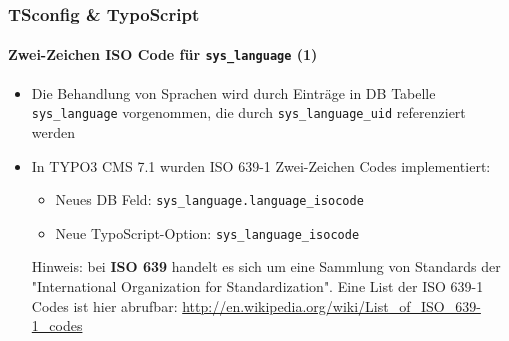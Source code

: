 
\begin{frame}[fragile]
	\frametitle{TSconfig \& TypoScript}
	\framesubtitle{Zwei-Zeichen ISO Code für \texttt{sys\_language} (1)}

	\begin{itemize}
		\item Die Behandlung von Sprachen wird durch Einträge in DB Tabelle
			\texttt{sys\_language} vorgenommen, die durch \texttt{sys\_language\_uid}
			referenziert werden
		\item In TYPO3 CMS 7.1 wurden ISO 639-1 Zwei-Zeichen Codes implementiert:

			\begin{itemize}
				\item Neues DB Feld: \texttt{sys\_language.language\_isocode}
				\item Neue TypoScript-Option: \texttt{sys\_language\_isocode}
			\end{itemize}

		\vspace{0.2cm}

		\small
			Hinweis: bei \textbf{ISO 639} handelt es sich um eine Sammlung von
			Standards der "International Organization for Standardization".
			Eine List der ISO 639-1 Codes ist hier abrufbar:\newline
			\url{http://en.wikipedia.org/wiki/List_of_ISO_639-1_codes}
		\normalsize

	\end{itemize}

\end{frame}


